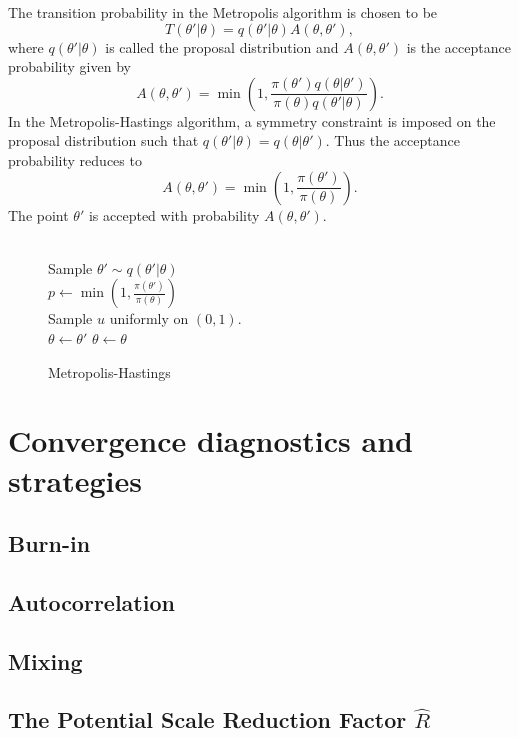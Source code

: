 The transition probability in the Metropolis algorithm is chosen to be
\begin{equation}
  T(\theta'|\theta) = q(\theta'|\theta)A(\theta,\theta'),
\end{equation}
where $q(\theta'|\theta)$ is called the proposal distribution and $A(\theta, \theta')$ is the acceptance probability given by
\begin{equation}
  A(\theta, \theta') = \min \left(1, \frac{\pi(\theta')q(\theta|\theta')}{\pi(\theta)q(\theta'|\theta)}\right).
\end{equation}
In the Metropolis-Hastings algorithm, a symmetry constraint is imposed on the proposal distribution such that 
$q(\theta'|\theta) = q(\theta|\theta')$. Thus the acceptance probability reduces to
\begin{equation}
  A(\theta, \theta') = \min \left(1, \frac{\pi(\theta')}{\pi(\theta)}\right).
\end{equation}
The point $\theta'$ is accepted with probability $A(\theta, \theta')$. 
\begin{figure}[H]
  \begin{algorithm}[H]
    \caption{Metropolis-Hastings}
    \begin{algorithmic}
      \\
      \State Sample $\theta' \sim q(\theta'|\theta)$\\
      \State $p \leftarrow \min \left(1, \frac{\pi(\theta')}{\pi(\theta)}\right)$\\
      \State Sample $u$ uniformly on $(0,1)$. \\
        \State $\theta \leftarrow \theta'$ 
      \Else
        \State $\theta \leftarrow \theta$  
      \EndIf\\
      \EndProcedure
    \end{algorithmic}
  \end{algorithm}
\end{figure}



\section{Convergence diagnostics and strategies}
\subsection{Burn-in}
\subsection{Autocorrelation}
\subsection{Mixing}
\subsection{The Potential Scale Reduction Factor $\hat{R}$}

